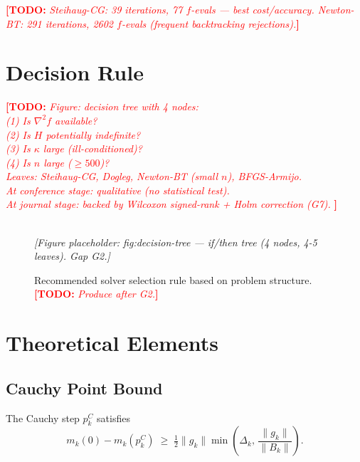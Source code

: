 \documentclass[11pt,a4paper]{article}
\newcommand{\TODO}[1]{\textcolor{red}{\textbf{[TODO:} \textit{#1}\textbf{]}}}
\newcommand{\FIG}[1]{%
  \begin{center}
    \fbox{\rule{0pt}{3.5cm}\rule{0.85\linewidth}{0pt}}\\[2pt]
    {\small\textit{[Figure placeholder: #1]}}
  \end{center}}
\newcommand{\norm}[1]{\lVert#1\rVert}
\newcommand{\mk}{m_k}
\newcommand{\gk}{g_k}
\newcommand{\Bk}{B_k}
\newcommand{\dk}{\Delta_k}
\begin{document}
\TODO{Steihaug-CG: 39 iterations, 77 $f$-evals --- best cost/accuracy.
Newton-BT: 291 iterations, 2602 $f$-evals (frequent backtracking rejections).}

\section{Decision Rule}
\label{sec:rule}

\TODO{%
  Figure: decision tree with 4 nodes:\\
  (1) Is $\nabla^2 f$ available?\\
  (2) Is $H$ potentially indefinite?\\
  (3) Is $\kappa$ large (ill-conditioned)?\\
  (4) Is $n$ large ($\ge 500$)?\\
  Leaves: Steihaug-CG, Dogleg, Newton-BT (small $n$), BFGS-Armijo.\\
  At conference stage: qualitative (no statistical test).\\
  At journal stage: backed by Wilcoxon signed-rank + Holm correction (G7).
}

\begin{figure}[htbp]
  \centering
  \FIG{fig:decision-tree --- if/then tree (4 nodes, 4-5 leaves).
       Gap G2.}
  \caption{Recommended solver selection rule based on problem structure.
    \TODO{Produce after G2.}}
  \label{fig:decision}
\end{figure}

\section{Theoretical Elements}
\label{sec:theory}

\subsection{Cauchy Point Bound}

\begin{proposition}
\label{prop:cauchy}
The Cauchy step $p^C_k$ satisfies
\begin{equation}
  \mk(0) - \mk(p^C_k)
  \;\ge\;
  \tfrac{1}{2}\norm{\gk}
  \min\!\left(\dk,\,\frac{\norm{\gk}}{\norm{\Bk}}\right).
  \label{eq:cauchy_bound}
\end{equation}
\end{proposition}
\end{document}
